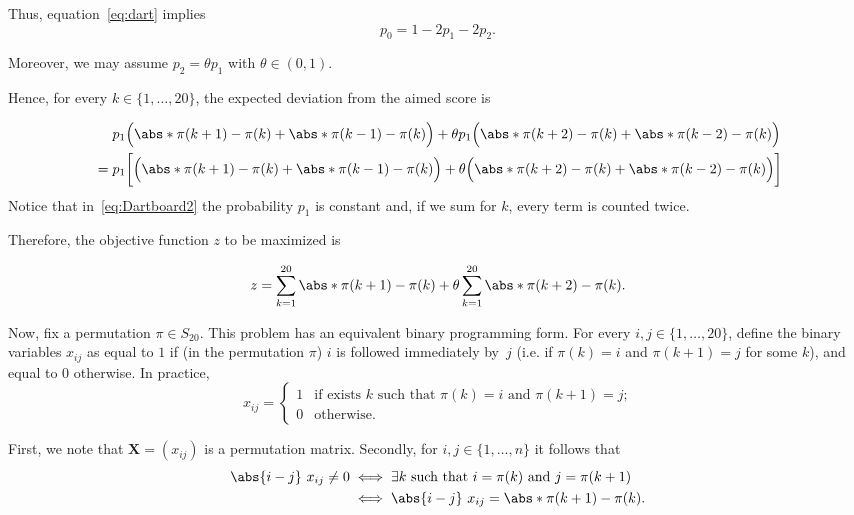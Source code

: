 Thus, equation~\eqref{eq:dart} implies
\begin{equation}
p_0 = 1 - 2 p_1 -2 p_2.
\end{equation}

\noindent Moreover, we may assume $p_2= \theta p_1$ with $\theta \in (0,1)$.

Hence, for every $k \in \{1,\dots,20\}$, the expected deviation from the aimed score is


\scriptsize
\begin{align}
	\label{eq:Dartboard2}
	\notag 
		&\quad \  p_1 \Big( \abs*{\pi(k+1)-\pi(k)}+ \abs*{\pi(k-1)-\pi(k)} \Big)
		+ \theta p_1 \Big(\abs*{\pi(k+2)-\pi(k)} + \abs*{\pi(k-2)-\pi(k)}\Big)\\
&=p_1 \bigg[ \Big( \abs*{\pi(k+1)-\pi(k)}+ \abs*{\pi(k-1)-\pi(k)} \Big)
+ \theta \Big(\abs*{\pi(k+2)-\pi(k)} + \abs*{\pi(k-2)-\pi(k)}\Big)\bigg]		
\end{align}
\normalsize
Notice that in~\eqref{eq:Dartboard2}  the probability $p_1$ is constant and, if we sum for $k$, every term is counted twice.

 Therefore, the objective function $z$ to be maximized is 

\begin{equation}
	\label{eq:Dart_z}
z = \sum_{k=1}^{20} \abs*{\pi(k+1)-\pi(k)} + \theta \sum_{k=1}^{20} \abs*{\pi(k+2)-\pi(k)}.
\end{equation}


\noindent Now, fix a permutation $\pi \in S_{20}$. This problem has an equivalent binary programming form. For every $i,j \in \{1,\dots,20\}$, define the binary variables $x_{ij}$ as equal to $1$ if (in the permutation $\pi$) $i$ is followed immediately by~$j$ (i.e. if $\pi(k) = i$ and $\pi(k + 1) = j$ for some $k$), and equal to $0$ otherwise. In practice, 
\begin{equation}
x_{ij}= \begin{cases}
	1 & \text{if exists $k$ such that $\pi(k)=i$ and $\pi(k+1)=j$;} \\
	0 & \text{otherwise.}
\end{cases}
\end{equation}

\noindent First, we note that $\bm X=(x_{ij})$ is a permutation matrix. Secondly, for $i,j\in\{1,\dots,n\}$ it follows that 
\small
\begin{equation}
	\label{eq:Dart_lineare}
\begin{split}	
\abs{i-j} \ x_{ij}\neq 0 
&\iff \text{$\exists k$ such that  $i=\pi(k)$ and $j=\pi(k+1)$}\\
&\iff \abs{i-j} \ x_{ij} = \abs*{\pi(k+1)-\pi(k)}	.
\end{split}	
\end{equation}	
\normalsize



